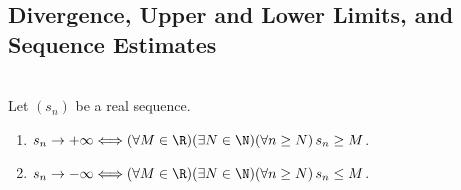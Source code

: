 \subsection{Divergence, Upper and Lower Limits, and Sequence Estimates}

\begin{definition} \label{def:sequence-diverges-to-infinity} \\
Let $(s_n)$ be a real sequence.
\begin{enumerate}[label=(\roman*)]
\setlength{\itemsep}{0pt}
\item $s_n\to+\infty\Longleftrightarrow(\forall M\in\R)(\exists N\in\N)(\forall n\geq N)\,s_n\geq M$.
\item $s_n\to-\infty\Longleftrightarrow(\forall M\in\R)(\exists N\in\N)(\forall n\geq N)\,s_n\leq M$.
\end{enumerate}
\end{definition}

